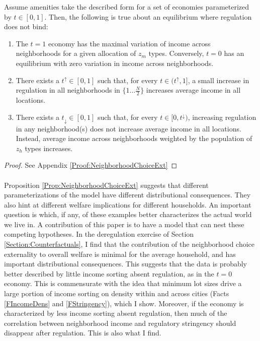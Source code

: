 \documentclass[11pt]{article}
\begin{document}
	\begin{Proposition}\label{Prop:NeighborhoodChoiceExt}
		Assume amenities take the described form for a set of economies parameterized by $t \in [0, 1]$. Then, the following is true about an equilibrium where regulation does not bind:
	
		\begin{enumerate}
			\item The $t = 1$ economy has the maximal variation of income across neighborhoods for a given allocation of $z_{m}$ types. Conversely, $t = 0$ has an equilibrium with zero variation in income across neighborhoods.
		
			\item There exists a $t^{\uparrow} \in [0, 1]$ such that, for every $t \in (t^{\uparrow}, 1]$, a small increase in regulation in all neighborhoods in $\{1 \dots \frac{N}{2}\}$ increases average income in all locations.
		
			\item There exists a $t_{\downarrow} \in [0, 1]$ such that, for every $t \in [0, t^{\downarrow})$, increasing regulation in any neighborhood(s) does not increase average income in all locations. Instead, average income across neighborhoods weighted by the population of $z_{h}$ types increases. 
		\end{enumerate}
	\end{Proposition}
	\begin{proof}
		See Appendix \ref{Proof:NeighborhoodChoiceExt}
	\end{proof}
	
	\paragraph*{}
	Proposition \ref{Prop:NeighborhoodChoiceExt}  suggests that different parameterizations of the model have different distributional consequences. They also hint at different welfare implications for different households. An important question is which, if any, of these examples better characterizes the actual world we live in. A contribution of this paper is to have a model that can nest these competing hypotheses. In the deregulation exercise of Section \ref{Section:Counterfactuals}, I find that the contribution of the neighborhood choice externality to overall welfare is minimal for the average household, and has important distributional consequences. This suggests that the data is probably better described by little income sorting absent regulation, as in the $t = 0$ economy. This is commensurate with the idea that minimum lot sizes drive a large portion of income sorting on density within and across cities (Facts \ref{FIncomeDens} and \ref{FStringency}), which I show. Moreover, if the economy is characterized by less income sorting absent regulation, then much of the correlation between neighborhood income and regulatory stringency should disappear after regulation. This is also what I find.
	
\end{document}
